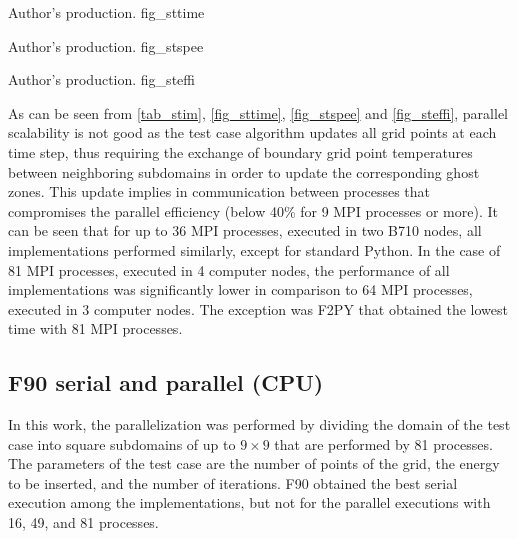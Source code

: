      {Author's production.} {fig_sttime}

     {Author's production.} {fig_stspee}

     {Author's production.} {fig_steffi}

As can be seen from \autoref {tab_stim}, \autoref {fig_sttime}, \autoref {fig_stspee} and \autoref {fig_steffi}, parallel scalability is not good as the test case algorithm updates all grid points at each time step, thus requiring the exchange of boundary grid point temperatures between neighboring subdomains in order to update the corresponding ghost zones. This update implies in communication between processes that compromises the parallel efficiency (below 40\% for 9 MPI processes or more). It can be seen that for up to 36 MPI processes, executed in two B710 nodes, all implementations performed similarly, except for standard Python. In the case of 81 MPI processes, executed in 4 computer nodes, the performance of all implementations was significantly lower in comparison to 64 MPI processes, executed in 3 computer nodes. The exception was F2PY that obtained the lowest time with 81 MPI processes.

%
%
%
\subsection{F90 serial and parallel (CPU)}
\label{sec_stenf90}

In this work, the parallelization was performed by dividing the domain of the test case into square subdomains of up to $ 9 \times 9 $ that are performed by 81 processes. The parameters of the test case are the number of points of the grid, the energy to be inserted, and the number of iterations. F90 obtained the best serial execution among the implementations, but not for the parallel executions with 16, 49, and 81 processes. 

